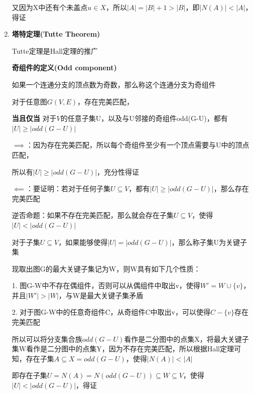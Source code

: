 \documentclass[UTF8]{ctexart}
\begin{document}
\begin{enumerate}
            又因为X中还有个未盖点$u\in X$，所以$|A|=|B|+1>|B|$，即$|N(A)|<|A|$，得证




      \item

            \textbf{塔特定理(Tutte Theorem)}\cite{tutte1950factorization}

            Tutte定理是Hall定理的推广

            \vspace{0.5cm}

            \textbf{奇组件的定义(Odd component)}

            如果一个连通分支的顶点数为奇数，那么称这个连通分支为奇组件

            \vspace{0.5cm}

            对于任意图$G(V,E)$，存在完美匹配，

            \textbf{当且仅当} 对于$V$的任意子集U，以及与U邻接的奇组件odd(G-U)，都有$|U|\ge|odd(G-U)|$

            $\implies$：因为存在完美匹配，所以每个奇组件至少有一个顶点需要与U中的顶点匹配，

            所以有$|U|\ge|odd(G-U)|$，充分性得证

            $\impliedby$：要证明：若对于任何子集$U\subseteq V$，都有$|U|\ge|odd(G-U)|$，那么存在完美匹配

            逆否命题：如果不存在完美匹配，那么就会存在子集$U\subseteq V$，使得$|U|<|odd(G-U)|$

            对于子集$U\subseteq V$，如果能够使得$|U|=|odd(G-U)|$，那么称子集U为关键子集

            现取出图G的最大关键子集记为W，则W具有如下几个性质：

            \vspace{0.5cm}

            1. 图G-W中不存在偶组件，否则可以从偶组件中取出v，使得$W'=W\cup\{v\}$，并且$|W'|>|W|$，与W是最大关键子集矛盾

            2. 对于图G-W中的任意奇组件C，从奇组件C中取出v，可以使得$C-\{v\}$存在完美匹配

            \vspace{0.5cm}

            所以可以将分支集合族$odd(G-U)$看作是二分图中的点集X，将最大关键子集W看作是二分图中的点集Y，因为不存在完美匹配，所以根据Hall定理可知，存在子集$A\subseteq X=odd(G-U)$，使得$|N(A)|<|A|$

            即存在子集$U=N(A)=N(odd(G-U))\subseteq W\subseteq V$，使得$|U|<|odd(G-U)|$，得证



\end{enumerate}
\end{document}
